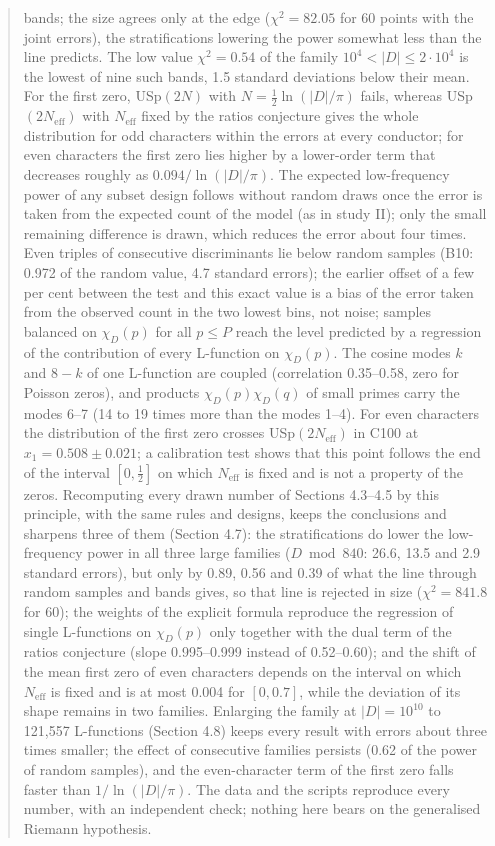 \documentclass[
  10pt,
]{article}
\begin{document}
\begin{abstract}
bands; the size agrees only at the edge (\(\chi^2 = 82.05\) for 60
points with the joint errors), the stratifications lowering the power
somewhat less than the line predicts. The low value \(\chi^2 = 0.54\) of
the family \(10^4 < |D| \le 2\cdot10^4\) is the lowest of nine such
bands, 1.5 standard deviations below their mean. For the first zero,
USp\((2N)\) with \(N = \frac12\ln(|D|/\pi)\) fails, whereas
USp\((2N_{\mathrm{eff}})\) with \(N_{\mathrm{eff}}\) fixed by the ratios
conjecture gives the whole distribution for odd characters within the
errors at every conductor; for even characters the first zero lies
higher by a lower-order term that decreases roughly as
\(0.094/\ln(|D|/\pi)\). The expected low-frequency power of any subset
design follows without random draws once the error is taken from the
expected count of the model (as in study II); only the small remaining
difference is drawn, which reduces the error about four times. Even
triples of consecutive discriminants lie below random samples (B10:
0.972 of the random value, 4.7 standard errors); the earlier offset of a
few per cent between the test and this exact value is a bias of the
error taken from the observed count in the two lowest bins, not noise;
samples balanced on \(\chi_D(p)\) for all \(p \le P\) reach the level
predicted by a regression of the contribution of every L-function on
\(\chi_D(p)\). The cosine modes \(k\) and \(8 - k\) of one L-function
are coupled (correlation 0.35--0.58, zero for Poisson zeros), and
products \(\chi_D(p)\chi_D(q)\) of small primes carry the modes 6--7 (14
to 19 times more than the modes 1--4). For even characters the
distribution of the first zero crosses USp\((2N_{\mathrm{eff}})\) in
C100 at \(x_1 = 0.508 \pm 0.021\); a calibration test shows that this
point follows the end of the interval \([0, \frac12]\) on which
\(N_{\mathrm{eff}}\) is fixed and is not a property of the zeros.
Recomputing every drawn number of Sections 4.3--4.5 by this principle,
with the same rules and designs, keeps the conclusions and sharpens
three of them (Section 4.7): the stratifications do lower the
low-frequency power in all three large families (\(D \bmod 840\): 26.6,
13.5 and 2.9 standard errors), but only by 0.89, 0.56 and 0.39 of what
the line through random samples and bands gives, so that line is
rejected in size (\(\chi^2 = 841.8\) for 60); the weights of the
explicit formula reproduce the regression of single L-functions on
\(\chi_D(p)\) only together with the dual term of the ratios conjecture
(slope 0.995--0.999 instead of 0.52--0.60); and the shift of the mean
first zero of even characters depends on the interval on which
\(N_{\mathrm{eff}}\) is fixed and is at most 0.004 for \([0, 0.7]\),
while the deviation of its shape remains in two families. Enlarging the
family at \(|D| = 10^{10}\) to 121,557 L-functions (Section 4.8) keeps
every result with errors about three times smaller; the effect of
consecutive families persists (0.62 of the power of random samples), and
the even-character term of the first zero falls faster than
\(1/\ln(|D|/\pi)\). The data and the scripts reproduce every number,
with an independent check; nothing here bears on the generalised Riemann
hypothesis.
\end{abstract}
\end{document}
